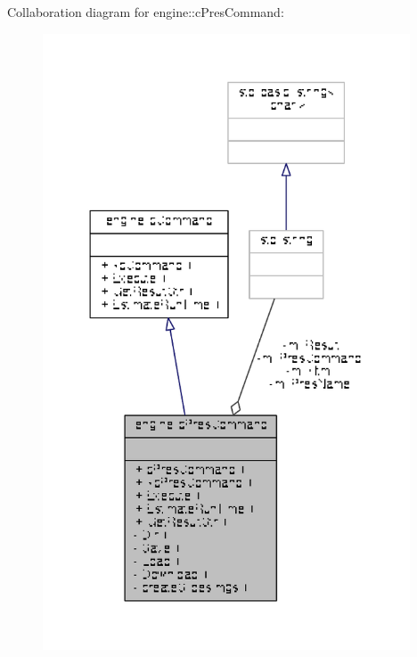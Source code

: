 Collaboration diagram for engine\-:\-:c\-Pres\-Command\-:
\nopagebreak
\begin{figure}[H]
\begin{center}
\leavevmode
\includegraphics[width=309pt]{classengine_1_1cPresCommand__coll__graph}
\end{center}
\end{figure}
